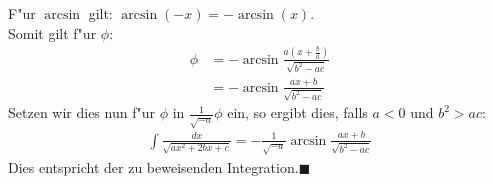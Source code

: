 \documentclass{theozettel}
\begin{document}
F"ur $\arcsin$ gilt: $\arcsin\left(-x\right)=-\arcsin\left(x\right)$.\\
Somit gilt f"ur $\phi$:
\begin{align*}
\phi &= -\arcsin{\frac{a \left(x+\frac{b}{a}\right)}{\sqrt{b^2-ac}}}\\
&= - \arcsin{\frac{ax+b}{\sqrt{b^2-ac}}}
\end{align*} 
Setzen wir dies nun f"ur $\phi$ in $\frac{1}{\sqrt{-a}}\phi$ ein, so ergibt dies, falls $a<0$ und $b^2>ac$:
\begin{align*}
\int{\frac{dx}{\sqrt{ax^2+2bx+c}}}=- \frac{1}{\sqrt{-a}}\arcsin{\frac{ax+b}{\sqrt{b^2-ac}}}
\end{align*}
Dies entspricht der zu beweisenden Integration.\qquad\qquad\qquad\qquad\qquad\qquad\qquad\qquad\qquad\qquad\qquad\qquad $\blacksquare$
\end{document}
